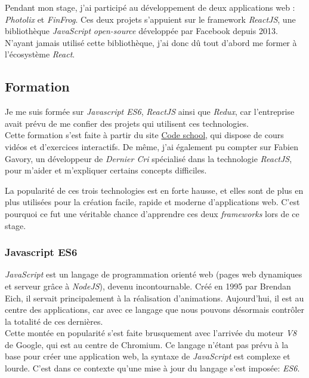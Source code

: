 \documentclass[12pt,a4paper]{article}
\begin{document}
  \bigskip

  Pendant mon stage, j'ai participé au développement de deux applications
  web : \emph{Photolix} et \emph{FinFrog}. Ces deux projets s'appuient sur
  le framework \emph{ReactJS}, une bibliothèque \emph{JavaScript}
  \emph{open-source} développée par Facebook depuis 2013. N'ayant jamais
  utilisé cette bibliothèque, j'ai donc dû tout d'abord me former à
  l'écosystème \emph{React}.

  \bigskip

  \subsection{Formation}\label{formation}

  \bigskip

  Je me suis formée sur \emph{Javascript ES6}, \emph{ReactJS} ainsi que
  \emph{Redux}, car l'entreprise avait prévu de me confier des projets qui
  utilisent ces technologies.\\
  Cette formation s'est faite à partir du site
  \href{https://www.codeschool.com/}{Code school}, qui dispose de cours
  vidéos et d'exercices interactifs. De même, j'ai également pu compter
  sur Fabien Gavory, un développeur de \emph{Dernier Cri} spécialisé dans
  la technologie \emph{ReactJS}, pour m'aider et m'expliquer certains
  concepts difficiles.

  \bigskip

  La popularité de ces trois technologies est en forte hausse, et elles
  sont de plus en plus utilisées pour la création facile, rapide et
  moderne d'applications web. C'est pourquoi ce fut une véritable chance
  d'apprendre ces deux \emph{frameworks} lors de ce stage.

  \bigskip

  \subsubsection{Javascript ES6}\label{javascript-es6}

  \bigskip

  \emph{JavaScript} est un langage de programmation orienté web (pages web
  dynamiques et serveur grâce à \emph{NodeJS}), devenu incontournable.
  Créé en 1995 par Brendan Eich, il servait principalement à la
  réalisation d'animations. Aujourd'hui, il est au centre des
  applications, car avec ce langage que nous pouvons désormais contrôler
  la totalité de ces dernières.\\
  Cette montée en popularité s'est faite brusquement avec l'arrivée du
  moteur \emph{V8} de Google, qui est au centre de Chromium. Ce langage
  n'étant pas prévu à la base pour créer une application web, la syntaxe
  de \emph{JavaScript} est complexe et lourde. C'est dans ce contexte
  qu'une mise à jour du langage s'est imposée: \emph{ES6}.
\end{document}

